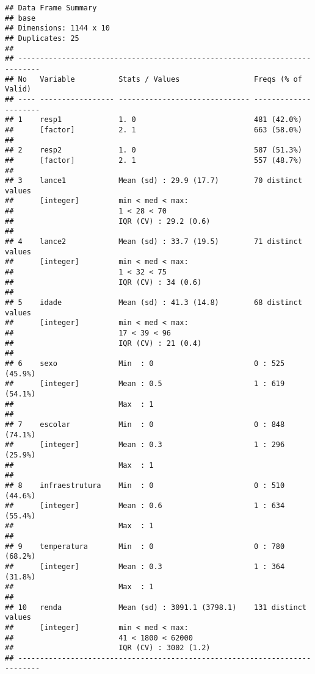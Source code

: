 \documentclass[smallextended]{svjour3}       %
\begin{document}
\begin{verbatim}
## Data Frame Summary  
## base  
## Dimensions: 1144 x 10  
## Duplicates: 25  
## 
## ---------------------------------------------------------------------------
## No   Variable          Stats / Values                 Freqs (% of Valid)   
## ---- ----------------- ------------------------------ ---------------------
## 1    resp1             1. 0                           481 (42.0%)          
##      [factor]          2. 1                           663 (58.0%)          
## 
## 2    resp2             1. 0                           587 (51.3%)          
##      [factor]          2. 1                           557 (48.7%)          
## 
## 3    lance1            Mean (sd) : 29.9 (17.7)        70 distinct values   
##      [integer]         min < med < max:                                    
##                        1 < 28 < 70                                         
##                        IQR (CV) : 29.2 (0.6)                               
## 
## 4    lance2            Mean (sd) : 33.7 (19.5)        71 distinct values   
##      [integer]         min < med < max:                                    
##                        1 < 32 < 75                                         
##                        IQR (CV) : 34 (0.6)                                 
## 
## 5    idade             Mean (sd) : 41.3 (14.8)        68 distinct values   
##      [integer]         min < med < max:                                    
##                        17 < 39 < 96                                        
##                        IQR (CV) : 21 (0.4)                                 
## 
## 6    sexo              Min  : 0                       0 : 525 (45.9%)      
##      [integer]         Mean : 0.5                     1 : 619 (54.1%)      
##                        Max  : 1                                            
## 
## 7    escolar           Min  : 0                       0 : 848 (74.1%)      
##      [integer]         Mean : 0.3                     1 : 296 (25.9%)      
##                        Max  : 1                                            
## 
## 8    infraestrutura    Min  : 0                       0 : 510 (44.6%)      
##      [integer]         Mean : 0.6                     1 : 634 (55.4%)      
##                        Max  : 1                                            
## 
## 9    temperatura       Min  : 0                       0 : 780 (68.2%)      
##      [integer]         Mean : 0.3                     1 : 364 (31.8%)      
##                        Max  : 1                                            
## 
## 10   renda             Mean (sd) : 3091.1 (3798.1)    131 distinct values  
##      [integer]         min < med < max:                                    
##                        41 < 1800 < 62000                                   
##                        IQR (CV) : 3002 (1.2)                               
## ---------------------------------------------------------------------------
\end{verbatim}
\end{document}

